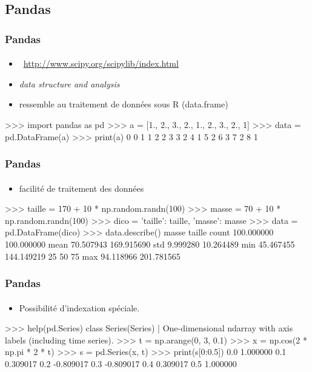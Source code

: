 \subsection{Pandas}
\begin{frame}[fragile]
\frametitle{Pandas}
\framesubtitle{}
\begin{itemize}
 \item {} \, \url{http://www.scipy.org/scipylib/index.html}
 \item \emph{data structure and analysis}
 \item ressemble au traitement de données sous R (data.frame) 
\end{itemize}

\begin{pythonConsole}
>>> import pandas as pd
>>> a = [1., 2., 3., 2., 1., 2., 3., 2., 1]
>>> data = pd.DataFrame(a)
>>> print(a)
   0
0  1
1  2
2  3
3  2
4  1
5  2
6  3
7  2
8  1
\end{pythonConsole}
\end{frame}
\begin{frame}[fragile]
\frametitle{Pandas}
\framesubtitle{}
\begin{itemize}
 \item facilité de traitement des données 
\end{itemize}

\begin{pythonConsole}
>>> taille = 170 + 10 * np.random.randn(100)
>>> masse = 70 + 10 * np.random.randn(100)
>>> dico = {'taille': taille, 'masse': masse}
>>> data = pd.DataFrame(dico)
>>> data.describe()
            masse      taille
count  100.000000  100.000000
mean    70.507943  169.915690
std      9.999280   10.264489
min     45.467455  144.149219
25%
50%
75%
max     94.118966  201.781565
\end{pythonConsole}
\end{frame}
\begin{frame}[fragile]
\frametitle{Pandas}
\framesubtitle{}
\begin{itemize}
 \item Possibilité d'indexation spéciale.  
\end{itemize}

\begin{pythonConsole}
>>> help(pd.Series)
class Series(Series)
 |  One-dimensional ndarray with axis labels (including time series).
>>> t = np.arange(0, 3, 0.1)
>>> x = np.cos(2 * np.pi * 2 * t)
>>> s = pd.Series(x, t)
>>> print(s[0:0.5])
0.0    1.000000
0.1    0.309017
0.2   -0.809017
0.3   -0.809017
0.4    0.309017
0.5    1.000000
\end{pythonConsole}
\end{frame}
